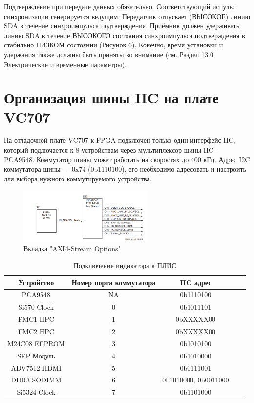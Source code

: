 \documentclass[a4paper,oneside ,10pt]{extreport}
\begin{document}
Подтверждение при передаче данных обязательно. Соответствующий испульс
синхронизации генерируется ведущим. Передатчик отпускает (ВЫСОКОЕ) линию SDA в
течение синхроимпульса подтверждения. Приёмник должен удерживать линию SDA в
течение ВЫСОКОГО состояния синхроимпульса подтверждения в стабильно НИЗКОМ
состоянии (Рисунок 6). Конечно, время установки и удержания также должны быть
приняты во внимание (см. Раздел 13.0 Электрические и временные параметры).

\section{Организация шины IIC на плате VC707}

На отладочной плате VC707 к FPGA подключен только один интерфейс IIC, 
который подлючается к 8 устройствам через мультиплексор шины IIC - PCA9548.
Коммутатор шины может работать на скоростях до 400 кГц. Адрес I2C коммутатора шины — 0x74 (0b1110100), 
его необходимо адресовать и настроить для выбора нужного коммутируемого устройства.

\begin{figure}[h]
	\centering
	\includegraphics[width=0.6\textwidth]{image/PCA9548.png}
	\caption{Вкладка "AXI4-Stream Options"}
	\label{PCA9548.PNG}
\end{figure}

\begin{table}[!ht]
	\begin{center}
		\begin{tabular}{c c c c c}
			\hline\hline
			Устройство & Номер порта коммутатора &  IIC адрес \\
			\hline
			PCA9548 		& NA &	0b1110100  \\
			Si570 Clock 	& 0 & 	0b1011101  \\
			FMC1 HPC 		& 1 & 	0bXXXXX00  \\
			FMC2 HPC 		& 2 & 	0bXXXXX00  \\
			M24C08 EEPROM 	& 3 & 	0b1010100   \\
			SFP Модуль 		& 4 & 	0b1010000   \\
			ADV7512 HDMI 	& 5 & 	0b0111001  \\
			DDR3 SODIMM 	& 6 & 	0b1010000, 0b0011000  \\
			Si5324 Clock 	& 7 & 	0b1101000  \\
			\hline
		\end{tabular}
		\caption{Подключение индикатора к ПЛИС}
		\label{LCD_TO_FPGA}
	\end{center}
\end{table}
\end{document}
